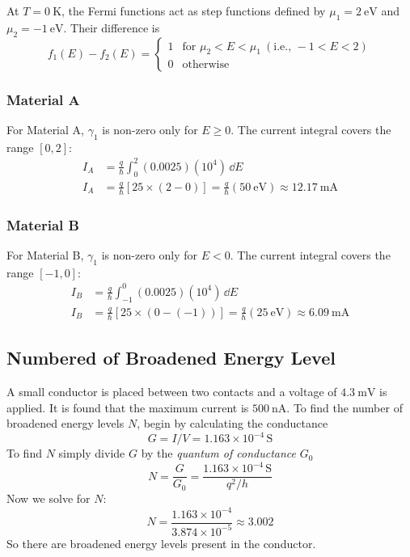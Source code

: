 \documentclass[a4paper, 10pt]{article}
\begin{document}
\noindent At $T = \SI{0}{\kelvin}$, the Fermi functions act as step functions defined by $\mu_1 = \SI{2}{\eV}$ and $\mu_2 = \SI{-1}{\eV}$. Their difference is
\begin{equation}
    f_1(E) - f_2(E) =
    \begin{cases}
        1 & \text{for } \mu_2 < E < \mu_1 \ (\text{i.e., } -1 < E < 2) \\
        0 & \text{otherwise}
    \end{cases}
\end{equation}

\subsubsection{Material A}
For Material A, $\gamma_1$ is non-zero only for $E \ge 0$.
\noindent The current integral covers the range $[0, 2]$:
\begin{align*}
    I_A &= \frac{q}{\hbar} \int_{0}^{2} (0.0025)(10^4) \, \dd{E} \\
    I_A &= \frac{q}{\hbar} [25 \times (2 - 0)] = \frac{q}{\hbar} (\SI{50}{\eV}) \approx \boxed{\SI{12.17}{\milli\ampere}}
\end{align*}

\subsubsection{Material B}
For Material B, $\gamma_1$ is non-zero only for $E < 0$.
\noindent The current integral covers the range $[-1, 0]$:
\begin{align*}
    I_B &= \frac{q}{\hbar} \int_{-1}^{0} (0.0025)(10^4) \, \dd{E} \\
    I_B &= \frac{q}{\hbar} [25 \times (0 - (-1))] = \frac{q}{\hbar} (\SI{25}{\eV}) \approx \boxed{\SI{6.09}{\milli\ampere}}
\end{align*}

\subsection{Numbered of Broadened Energy Level}
A small conductor is placed between two contacts and a voltage of $\SI{4.3}{\unit{\milli\volt}}$ is applied. It is found that the maximum current is $\SI{500}{\unit{\nano\ampere}}$. To find the number of broadened energy levels $N$, begin by calculating the conductance
\[
    G = I/V = 1.163 \times 10^{-4}\,\unit{\siemens}
\]
To find $N$ simply divide $G$ by the \textit{quantum of conductance} $G_0$
\[
N = \frac{G}{G_0} = \frac{1.163 \times 10^{-4}\,\unit{\siemens}}{q^2/h}
\]
Now we solve for $N$:
\[
    N = \frac{1.163 \times 10^{-4}}{3.874 \times 10^{-5}} \approx 3.002
\]
So there are  broadened energy levels present in the conductor.
\end{document}
